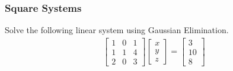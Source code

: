 \subsubsection{Square Systems}
\begin{exmp}
Solve the following linear system using Gaussian Elimination.
\begin{align*}
\begin{bmatrix}
1 & 0 & 1 \\
1 & 1 & 4 \\
2 & 0 & 3
\end{bmatrix}
\begin{bmatrix}
x \\
y \\
z
\end{bmatrix}
=
\begin{bmatrix}
3 \\
10 \\
8
\end{bmatrix}
\end{align*}
\end{exmp}
